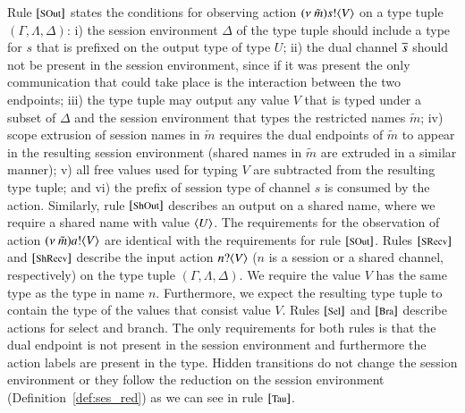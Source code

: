 Rule ${\footnotesize [\textrm{SOut}]}$ states the conditions for observing action
$(\nu\ \tilde{m}) s ! \langle V \rangle$ on a type tuple $(\Gamma, \Lambda, \Delta)$:
i) the session environment $\Delta$ of the type tuple should include
a type for $s$ that is prefixed on the output type of type $U$;
ii) the dual channel $\overline{s}$ should not be
present in the session environment, since if it was present
the only communication that could take place is the interaction
between the two endpoints;
iii) the type tuple may output any
value $V$ that is typed under a subset of $\Delta$ and
the session environment that types the restricted names
$\tilde{m}$;
iv) scope extrusion of session names in $\tilde{m}$ requires
the dual endpoints of $\tilde{m}$ to appear in
the resulting session environment (shared names in
$\tilde{m}$ are extruded in a similar manner);
v) all free values used for typing $V$ are subtracted from the
resulting type tuple; and
vi) the prefix of session type of channel $s$ is consumed by the action.
Similarly, rule ${\footnotesize [\textrm{ShOut}]}$ describes an output on a shared name,
where we require a shared name with value $\langle U \rangle$.
The requirements for the observation of action
$(\nu\ \tilde{m}) a ! \langle V \rangle$ are identical with the requirements for
rule ${\footnotesize [\textrm{SOut}]}$.
Rules ${\footnotesize [\textrm{SRecv}]}$ and ${\footnotesize [\textrm{ShRecv}]}$ describe
the input action $n ? \langle V \rangle$ ($n$ is a session or a shared channel, respectively)
on the type tuple $(\Gamma, \Lambda, \Delta)$.
We require the value $V$ has the same type as the type in name $n$.
Furthermore,
we expect the resulting type tuple to contain the type of the
values that consist value $V$.
Rules ${\footnotesize [\textrm{Sel}]}$ and ${\footnotesize [\textrm{Bra}]}$ describe actions for
select and branch. The only requirements for both
rules is that the dual endpoint is not present in the session
environment and furthermore the action labels are present
in the type.
Hidden transitions do not change the session environment
or they follow the reduction on the session
environment (Definition~\ref{def:ses_red}) as we can see in rule
${\footnotesize [\textrm{Tau}]}$.

\begin{comment}
A second environment LTS, denoted $\hby{\ell}$,
is defined in the lower part of Figure~\ref{fig:envLTS}.
The definition substitutes rules
$\eltsrule{SRecv}$ and $\eltsrule{ShRecv}$
of relation $\by{\ell}$ with rule $\eltsrule{RRcv}$.
All other cases remain the same as the cases for
relation $\by{\ell}$.
Rule $\eltsrule{RRcv}$ restricts the higher-order input
in relation $\hby{\ell}$;
only characteristic processes and trigger processes
are allowed to be received on a higher-order input.
Names can still be received as in the definition of
the $\by{\ell}$ relation.
The conditions for input follow the conditions
for the $\by{\ell}$ definition.
\end{comment}

